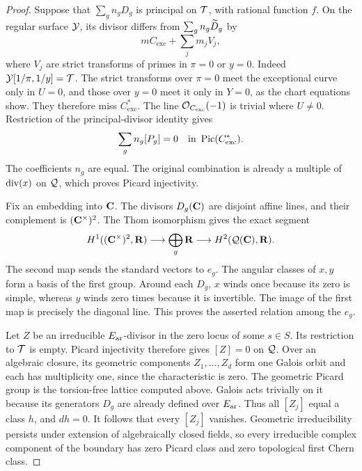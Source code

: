 \begin{proof}
Suppose that \(\sum_g n_gD_g\) is principal on \(\mathcal T\), with
rational function \(f\).
On the regular surface \(\mathcal Y\), its divisor differs from
\(\sum_g n_g\widetilde D_g\) by
\[
 mC_{\mathrm{exc}}+\sum_jm_jV_j,
\]
where \(V_j\) are strict transforms of primes in \(\pi=0\) or \(y=0\).
Indeed \(\mathcal Y[1/\pi,1/y]=\mathcal T\).
The strict transforms over \(\pi=0\) meet the exceptional curve only
in \(U=0\), and those over \(y=0\) meet it only in \(Y=0\), as the
chart equations show.
They therefore miss \(C_{\mathrm{exc}}^*\).
The line \(\mathcal O_{C_{\mathrm{exc}}}(-1)\) is trivial where \(U\ne0\).
Restriction of the principal-divisor identity gives
\[
 \sum_g n_g[P_g]=0\quad\text{in }\operatorname{Pic}(C_{\mathrm{exc}}^*).
\]
The coefficients \(n_g\) are equal.
The original combination is already a multiple of \(\operatorname{div}(x)\)
on \(\mathcal Q\), which proves Picard injectivity.

Fix an embedding into \(\mathbf{C}\).
The divisors \(D_g(\mathbf{C})\) are disjoint affine lines, and their
complement is \((\mathbf{C}^\times)^2\).
The Thom isomorphism gives the exact segment
\[
 H^1((\mathbf{C}^\times)^2,\mathbf{R})
 \longrightarrow \bigoplus_g\mathbf{R}
 \longrightarrow H^2(\mathcal Q(\mathbf{C}),\mathbf{R}).
\]
The second map sends the standard vectors to \(e_g\).
The angular classes of \(x,y\) form a basis of the first group.
Around each \(D_g\), \(x\) winds once because its zero is simple,
whereas \(y\) winds zero times because it is invertible.
The image of the first map is precisely the diagonal line.
This proves the asserted relation among the \(e_g\).

Let \(Z\) be an irreducible \(E_{\mathrm{ar}}\)-divisor in the zero locus of
some \(s\in S\).
Its restriction to \(\mathcal T\) is empty.
Picard injectivity therefore gives \([Z]=0\) on \(\mathcal Q\).
Over an algebraic closure, its geometric components
\(Z_1,\ldots,Z_d\) form one Galois orbit and each has multiplicity
one, since the characteristic is zero.
The geometric Picard group is the torsion-free lattice computed
above. Galois acts trivially on it because its generators \(D_g\)
are already defined over \(E_{\mathrm{ar}}\).
Thus all \([Z_j]\) equal a class \(h\), and \(dh=0\).
It follows that every \([Z_j]\) vanishes.
Geometric irreducibility persists under extension of algebraically
closed fields, so every irreducible complex component of the boundary
has zero Picard class and zero topological first Chern class.


\end{proof}
